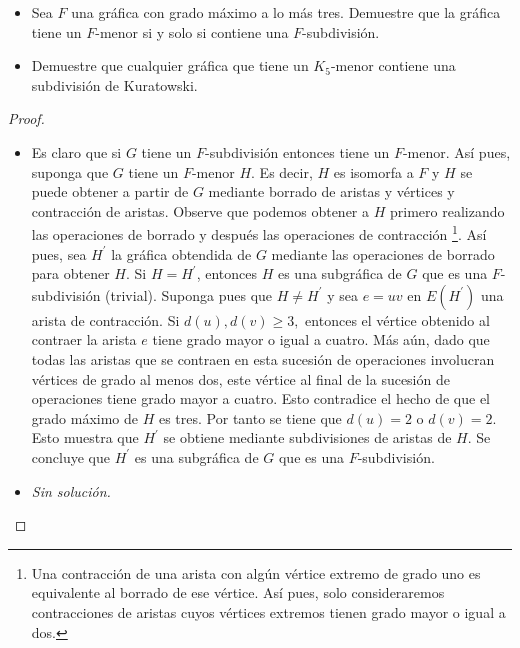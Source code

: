 \documentclass[12pt]{article}
\newenvironment{problem}[2][Problema]{\begin{trivlist}
\item[\hskip \labelsep {\bfseries #1}\hskip \labelsep {\bfseries #2.}]}{\end{trivlist}}
\begin{document}
\begin{problem}{10.5.3}
\text{}
\begin{itemize}
    \item[a)] Sea $F$ una gráfica con grado máximo a lo más tres. Demuestre que la gráfica tiene un $F$-menor si y solo si contiene una $F$-subdivisión.
    \item[b)] Demuestre que cualquier gráfica que tiene un $K_5$-menor contiene una subdivisión de Kuratowski.
\end{itemize}
\end{problem}
\begin{proof}
\textbf{}
\begin{itemize}
    \item[a)] Es claro que si $G$ tiene un $F$-subdivisión entonces tiene un $F$-menor. Así pues, suponga que $G$ tiene un $F$-menor $H$. Es decir, $H$ es isomorfa a $F$ y $H$ se puede obtener a partir de $G$ mediante borrado de aristas y vértices y contracción de aristas. Observe que podemos obtener a $H$ primero realizando las operaciones de borrado y después las operaciones de contracción \footnote{Una contracción de una arista con algún vértice extremo de grado uno es equivalente al borrado de ese vértice. Así pues, solo consideraremos contracciones de aristas cuyos vértices extremos tienen grado mayor o igual a dos.}. Así pues, sea $H^\prime$ la gráfica obtendida de $G$ mediante las operaciones de borrado para obtener $H.$ Si $H = H^\prime$, entonces $H$ es una subgráfica de $G$ que es una $F$-subdivisión (trivial). Suponga pues que $H \neq H^\prime$ y sea $e = uv$ en $E(H^\prime)$ una arista de contracción. Si $d(u), d(v) \geq 3,$ entonces el vértice obtenido al contraer la arista $e$ tiene grado mayor o igual a cuatro. Más aún, dado que todas las aristas que se contraen en esta sucesión de operaciones involucran vértices de grado al menos dos, este vértice al final de la sucesión de operaciones tiene grado mayor a cuatro. Esto contradice el hecho de que el grado máximo de $H$ es tres. Por tanto se tiene que $d(u) = 2$ o $d(v) = 2.$ Esto muestra que $H^\prime$ se obtiene mediante subdivisiones de aristas de $H$. Se concluye que $H^\prime$ es una subgráfica de $G$ que es una $F$-subdivisión.
    
    \item[b)] \textit{Sin solución.}

    \end{itemize}
\end{proof}



\printbibliography
\end{document}
